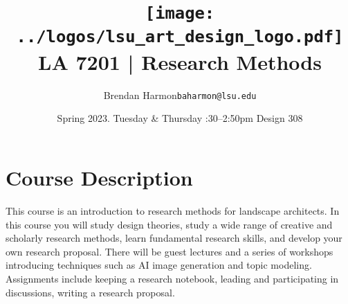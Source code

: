 \documentclass[11pt,article,oneside]{memoir}
\makeatletter
\def\myauthor{Author}
\def\mytitle{Title}
\def\myemail{baharmon@lsu.edu}
\def\myauthor{Brendan Harmon}
\def\mytitle{ \texttt{[image: ../logos/lsu\_art\_design\_logo.pdf]} \\[0.1cm] {\normalfont \normalsize LA 7201 |} \Large Research Methods}
\newcommand{\globalcolor}[1]{%
  \color{#1}\global\let\default@color\current@color
}
\makeatother
\begin{document}
\setlength\bibitemsep{0.5em}

\setmainfont{IBM Plex Sans}
\setmonofont[Scale=0.8]{IBM Plex Mono}

\def\ind{\hangindent=1 true cm\hangafter=1 \noindent}
\def\labelitemi{$\cdot$}

\title{\LARGE \mytitle}
\author{\Large\myauthor \newline \footnotesize\texttt{\noindent\myemail}}
\date{Spring 2023. \newline Tuesday \& Thursday :30--2:50pm \newline Design 308}
\published{\,}





\globalcolor{black}

\vspace*{-10em}
\maketitle

\section{Course Description}
This course is an introduction to
research methods for landscape architects.
In this course you will 
study design theories, 
study a wide range of
creative and scholarly research methods,
learn fundamental research skills, 
and develop your own research proposal.
There will be guest lectures
and a series of workshops
introducing techniques such as 
AI image generation and topic modeling.
Assignments include 
keeping a research notebook,
leading and participating in discussions, 
writing a research proposal.
\end{document}

